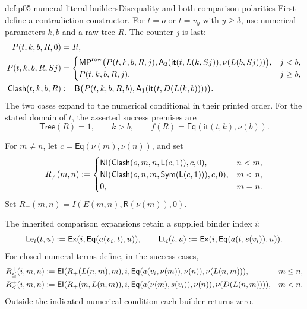 \begin{hbdefinition}{def:p05-numeral-literal-builders}{Disequality and both comparison polarities}
First define a contradiction constructor. For \(t=o\) or \(t=v_y\)
with \(y\geq3\), use numerical parameters \(k,b\) and a raw tree \(R\).
The counter \(j\) is last:
\[
\begin{aligned}
 P(t,k,b,R,0)&=R,\\
 P(t,k,b,R,Sj)&=
 \begin{cases}
 \mathsf{MP}^{\rm row}\bigl(P(t,k,b,R,j),
    \mathsf A_2(\mathsf{it}(t,L(k,Sj)),\nu(L(b,Sj)))\bigr),&j<b,\\
 P(t,k,b,R,j),&j\geq b,
 \end{cases}\\
 \mathsf{Clash}(t,k,b,R)&\mathrel{:=}
 \mathsf B\bigl(P(t,k,b,R,b),
                    \mathsf A_1(\mathsf{it}(t,D(L(k,b))))\bigr).
\end{aligned}
\]
The two cases expand to the numerical conditional in their printed order.
For the stated domain of \(t\), the asserted success premises are
\[
 \mathsf{Tree}(R)=1,\qquad k>b,\qquad
 f(R)=\mathsf{Eq}(\mathsf{it}(t,k),\nu(b)).
\]

For \(m\ne n\), let \(c=\mathsf{Eq}(\nu(m),\nu(n))\), and set
\[
 R_{\ne}(m,n)\mathrel{:=}
 \begin{cases}
 \mathsf{NI}(\mathsf{Clash}(o,m,n,\mathsf L(c,1)),c,0),&n<m,\\
 \mathsf{NI}(\mathsf{Clash}(o,n,m,\mathsf{Sym}(\mathsf L(c,1))),c,0),&m<n,\\
 0,&m=n.
 \end{cases}
\]
Set \(R_{=}(m,n)=I(E(m,n),\mathsf R(\nu(m)),0)\).

The inherited comparison expansions retain a supplied binder index \(i\):
\[
 \mathsf{Le}_i(t,u)\mathrel{:=}\mathsf{Ex}(i,\mathsf{Eq}(a(v_i,t),u)),\qquad
 \mathsf{Lt}_i(t,u)\mathrel{:=}\mathsf{Ex}(i,\mathsf{Eq}(a(t,s(v_i)),u)).
\]
For closed numeral terms define, in the success cases,
\[
\begin{aligned}
 R_{\leq}^+(i,m,n)&\mathrel{:=}
  \mathsf{EI}(R_+(L(n,m),m),i,\mathsf{Eq}(a(v_i,\nu(m)),\nu(n)),\nu(L(n,m))),
       &&m\leq n,\\
 R_<^+(i,m,n)&\mathrel{:=}
  \mathsf{EI}(R_+(m,L(n,m)),i,\mathsf{Eq}(a(\nu(m),s(v_i)),\nu(n)),
                                            \nu(D(L(n,m)))),&&m<n.
\end{aligned}
\]
Outside the indicated numerical condition each builder returns zero.


\end{hbdefinition}

